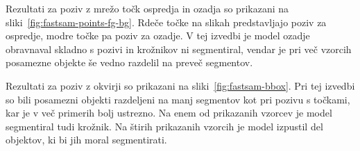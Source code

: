 \documentclass[a4paper,twoside,openright,12pt,slovene]{book}
\begin{document}
            Rezultati za poziv z mrežo točk ospredja in ozadja so prikazani na
            sliki~\ref{fig:fastsam-points-fg-bg}.
            Rdeče točke na slikah predstavljajo poziv za ospredje, modre točke
            pa poziv za ozadje. V tej izvedbi je model ozadje obravnaval
            skladno s pozivi in krožnikov ni segmentiral, vendar je pri več
            vzorcih posamezne objekte še vedno razdelil na preveč segmentov.

            Rezultati za poziv z okvirji so prikazani na
            sliki~\ref{fig:fastsam-bbox}.
            Pri tej izvedbi so bili posamezni objekti razdeljeni na manj
            segmentov kot pri pozivu s točkami, kar je v več primerih bolj
            ustrezno. Na enem od prikazanih vzorcev je model segmentiral tudi
            krožnik. Na štirih prikazanih vzorcih je model izpustil del
            objektov, ki bi jih moral segmentirati.
\end{document}
